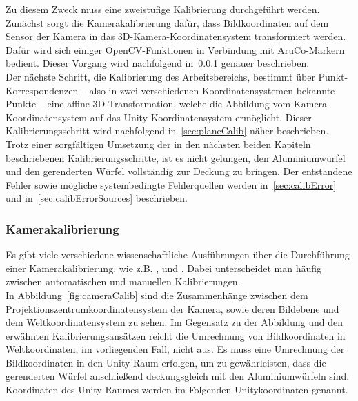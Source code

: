 Zu diesem Zweck muss eine zweistufige Kalibrierung durchgeführt werden. Zunächst sorgt die Kamerakalibrierung dafür, dass Bildkoordinaten auf dem Sensor der Kamera in das 3D-Kamera-Koordinatensystem transformiert werden. Dafür wird sich einiger OpenCV-Funktionen in Verbindung mit AruCo-Markern bedient. Dieser Vorgang wird nachfolgend in~\ref{sec:camCalib} genauer beschrieben.\\
Der nächste Schritt, die Kalibrierung des Arbeitsbereichs, bestimmt über Punkt-Korrespondenzen -- also in zwei verschiedenen Koordinatensystemen bekannte Punkte -- eine affine 3D-Transformation, welche die Abbildung vom Kamera-Koordinaten\-system auf das Unity-Koordinatensystem ermöglicht. Dieser Kalibrierungsschritt wird nachfolgend in~\ref{sec:planeCalib} näher beschrieben.\\
Trotz einer sorgfältigen Umsetzung der in den nächsten beiden Kapiteln beschriebenen Kalibrierungsschritte, ist es nicht gelungen, den Aluminiumwürfel und den gerenderten Würfel vollständig zur Deckung zu bringen. Der entstandene Fehler sowie mögliche systembedingte Fehlerquellen werden in~\ref{sec:calibError} und in~\ref{sec:calibErrorSources} beschrieben. 

\subsubsection{Kamerakalibrierung}\label{sec:camCalib}

Es gibt viele verschiedene wissenschaftliche Ausführungen über die Durchführung einer Kamerakalibrierung, wie z.B. \cite{5982395}, \cite{888718} und \cite{faugeras1993three}. Dabei unterscheidet man häufig zwischen automatischen und manuellen Kalibrierungen. \\
In Abbildung~\ref{fig:cameraCalib} sind die Zusammenhänge zwischen dem Projektionszentrumkoordinatensystem der Kamera, sowie deren Bildebene und dem Weltkoordinatensystem zu sehen. Im Gegensatz zu der Abbildung und den erwähnten Kalibrierungsansätzen reicht die Umrechnung von Bildkoordinaten in Weltkoordinaten, im vorliegenden Fall, nicht aus. Es muss eine Umrechnung der Bildkoordinaten in den Unity Raum erfolgen, um zu gewährleisten, dass die gerenderten Würfel anschließend deckungsgleich mit den Aluminiumwürfeln sind. Koordinaten des Unity Raumes werden im Folgenden Unitykoordinaten genannt.\\


